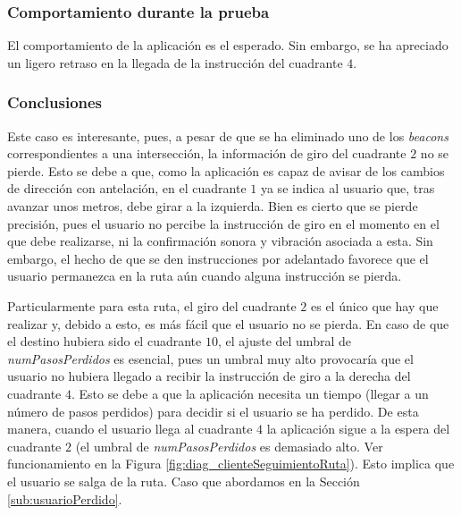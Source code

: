 \subsubsection*{Comportamiento durante la prueba}

El comportamiento de la aplicación es el esperado. Sin embargo, se ha apreciado un ligero retraso en la llegada de la instrucción del cuadrante $4$. 

 
\subsubsection*{Conclusiones}

Este caso es interesante, pues, a pesar de que se ha eliminado uno de los \textit{beacons} correspondientes a una intersección, la información de giro del cuadrante $2$ no se pierde. Esto se debe a que, como la aplicación es capaz de avisar de los cambios de dirección con antelación, en el cuadrante $1$ ya se indica al usuario que, tras avanzar unos metros, debe girar a la izquierda. Bien es cierto que se pierde precisión, pues el usuario no percibe la instrucción de giro en el momento en el que debe realizarse, ni la confirmación sonora y vibración asociada a esta. Sin embargo, el hecho de que se den instrucciones por adelantado favorece que el usuario permanezca en la ruta aún cuando alguna instrucción se pierda. 

Particularmente para esta ruta, el giro del cuadrante $2$ es el único que hay que realizar y, debido a esto, es más fácil que el usuario no se pierda. En caso de que el destino hubiera sido el cuadrante $10$, el ajuste del umbral de \textit{numPasosPerdidos} es esencial, pues un umbral muy alto provocaría que el usuario no hubiera llegado a recibir la instrucción de giro a la derecha del cuadrante $4$. Esto se debe a que la aplicación necesita un tiempo (llegar a un número de pasos perdidos) para decidir si el usuario se ha perdido. De esta manera, cuando el usuario llega al cuadrante $4$ la aplicación sigue a la espera del cuadrante $2$ (el umbral de \textit{numPasosPerdidos} es demasiado alto. Ver funcionamiento en la Figura \ref{fig:diag_clienteSeguimientoRuta}). Esto implica que el usuario se salga de la ruta. Caso que abordamos en la Sección \ref{sub:usuarioPerdido}.


